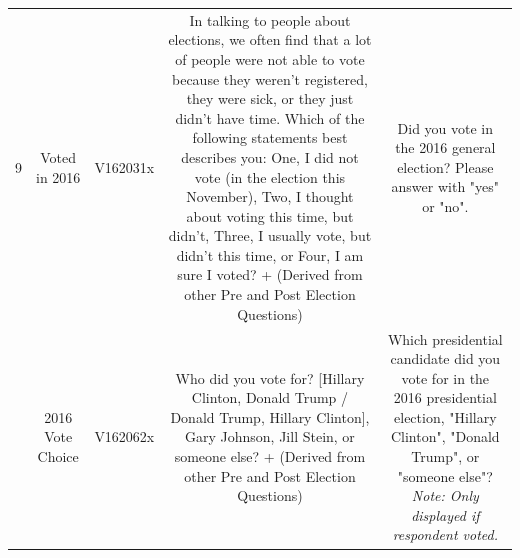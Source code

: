 \documentclass[11pt]{article}
\begin{document}
\begin{longtable}{ccccc}
    \multirow{20}{2em}{9} & \multirow{20}{4.5em}{Voted in 2016} & \multirow{20}{4em}{V162031x} & \multirow{20}{12em}{In talking to people about elections, we often find that a lot of people were not able to vote because they weren’t registered, they were sick, or they just didn’t have time. Which of the following statements best describes you: One, I did not vote (in the election this November), Two, I thought about voting this time, but didn’t, Three, I usually vote, but didn’t this time, or Four, I am sure I voted? + (Derived from other Pre and Post Election Questions)} & \multirow{20}{12em}{Did you vote in the 2016 general election? Please answer with "yes" or "no".}\\&&&&\\&&&&\\&&&&\\&&&&\\&&&&\\&&&&\\&&&&\\&&&&\\&&&&\\&&&&\\&&&&\\&&&&\\&&&&\\&&&&\\&&&&\\&&&&\\&&&&\\&&&&\\&&&&\\
    \hline
    \pagebreak

    \multirow{9}{2em}{10} & \multirow{9}{4.5em}{2016 Vote Choice} & \multirow{9}{4em}{V162062x} & \multirow{9}{12em}{Who did you vote for? [Hillary Clinton, Donald Trump / Donald Trump, Hillary Clinton], Gary Johnson, Jill Stein, or someone else? + (Derived from other Pre and Post Election Questions)} & \multirow{9}{12em}{Which presidential candidate did you vote for in the 2016 presidential election, "Hillary Clinton", "Donald Trump", or "someone else"? \emph{Note: Only displayed if respondent voted.}}\\&&&&\\&&&&\\&&&&\\&&&&\\&&&&\\&&&&\\&&&&\\&&&&\\
    \hline


\end{longtable}
\end{document}
